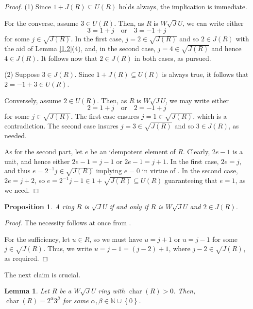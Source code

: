 \documentclass[12pt]{amsart}
\newtheorem{proposition}[theorem]{Proposition} \newtheorem{lemma}[theorem]{Lemma}
\begin{document}
\begin{proof} (1) Since \( 1 + J(R) \subseteq U(R) \) holds always, the implication is immediate.

For the converse, assume \( 3 \in U(R) \). Then, as \( R \) is $W\sqrt{J}U$, we can write either \[ 3 = 1 + j \quad \text{or} \quad 3 = -1 + j \] for some \( j \in \sqrt{J(R)} \). In the first case, \( j = 2 \in \sqrt{J(R)} \) and so $2\in J(R)$ with the aid of Lemma \ref{1.2}(4), and, in the second case, \( j = 4 \in \sqrt{J(R)} \) and hence $4\in J(R)$. It follows now that \( 2 \in J(R) \) in both cases, as pursued.

(2) Suppose \( 3 \in J(R) \). Since \( 1 + J(R) \subseteq U(R) \) is always true, it follows that \( 2 = -1 + 3 \in U(R) \).

Conversely, assume \( 2 \in U(R) \). Then, as \( R \) is $W\sqrt{J}U$, we may write either
\[ 2 = 1 + j \quad \text{or} \quad 2 = -1 + j \] for some \( j \in \sqrt{J(R)} \). The first case ensures \( j=
1 \in \sqrt{J(R)} \), which is a contradiction. The second case insures \( j = 3 \in \sqrt{J(R)} \) and so $3\in J(R)$, as needed.

As for the second part, let \(e\) be an idempotent element of \(R\). Clearly, \(2e - 1\) is a unit, and hence
either \(2e - 1 = j - 1\) or \(2e - 1 = j + 1\). In the first case, \(2e = j\), and thus \(e = 2^{-1}j\in \sqrt{J(R)} \) implying \(e = 0\) in virtue of \cite[Proposition 2.1]{SU}. In the second case, \(2e = j + 2\), so \(e = 2^{-1}j + 1\in 1+ \sqrt{J(R)}\subseteq U(R)
\) guaranteeing that \(e = 1\), as we need.
\end{proof}

\begin{proposition}\label{mino} A ring \(R\) is $\sqrt{J}U$ if and only if \(R\) is $W\sqrt{J}U$ and \(2 \in
J(R)\).
\end{proposition}

\begin{proof} The necessity follows at once from \cite[Proposition 2.5]{SU}.

For the sufficiency, let \(u \in R\), so we must have \(u = j + 1\) or \(u = j - 1\) for some $j\in \sqrt{J(R)}$. Thus, we write \(u = j - 1 = (j - 2) + 1\), where \(j - 2\in \sqrt{J(R)}\), as required.
\end{proof}

The next claim is crucial.

\begin{lemma}\label{char} Let $R$ be a $W\sqrt{J}U$ ring with $\operatorname{char}(R) > 0$. Then,
$\operatorname{char}(R) = 2^{\alpha}3^{\beta}$ for some $\alpha, \beta \in \mathbb{N}  \cup \left\{ 0 \right\}$.
\end{lemma}
\end{document}

